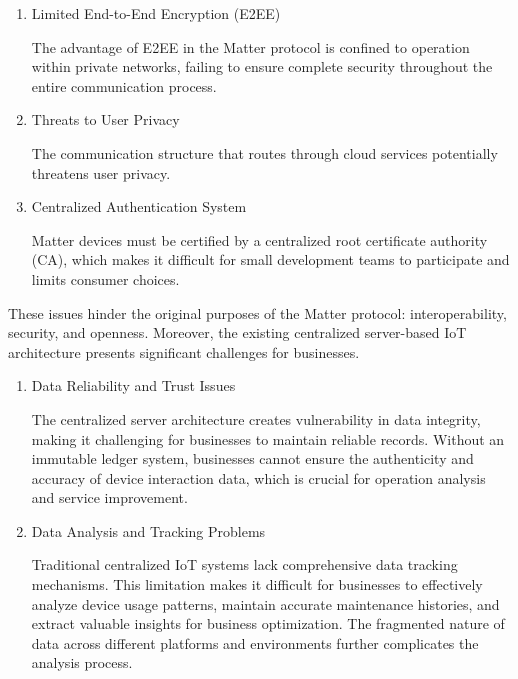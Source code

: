\documentclass[conference]{IEEEtran}
\begin{document}
\begin{enumerate}[itemsep=2ex, parsep=1ex]
	\item Limited End-to-End Encryption (E2EE)
	      	      	      
	      The advantage of E2EE in the Matter protocol is confined to operation
	      within private networks, failing to ensure complete security throughout the
	      entire communication process.
	      	      	      
	\item Threats to User Privacy
	      	      	      
	      The communication structure that routes through cloud services potentially
	      threatens user privacy.
	      	      	      
	\item Centralized Authentication System
	      	      	      
	      Matter devices must be certified by a centralized root certificate
	      authority (CA), which makes it difficult for small development teams to participate
	      and limits consumer choices.
\end{enumerate}

These issues hinder the original purposes of the Matter protocol: interoperability,
security, and openness. Moreover, the existing centralized server-based IoT architecture
presents significant challenges for businesses.

\begin{enumerate}[itemsep=2ex, parsep=1ex]
	\item Data Reliability and Trust Issues
	      	      	      
	      The centralized server architecture creates vulnerability in data
	      integrity, making it challenging for businesses to maintain reliable records.
	      Without an immutable ledger system, businesses cannot ensure the authenticity
	      and accuracy of device interaction data, which is crucial for operation
	      analysis and service improvement.
	      	      	      
	\item Data Analysis and Tracking Problems
	      	      	      
	      Traditional centralized IoT systems lack comprehensive data tracking
	      mechanisms. This limitation makes it difficult for businesses to effectively
	      analyze device usage patterns, maintain accurate maintenance histories, and
	      extract valuable insights for business optimization. The fragmented nature
	      of data across different platforms and environments further complicates
	      the analysis process.
\end{enumerate}
\end{document}
